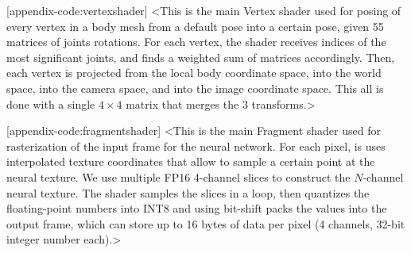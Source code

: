 [appendix-code:vertexshader]
<This is the main Vertex shader used for posing of every vertex in a body mesh from a default pose into a certain pose, given 55 matrices of joints rotations. For each vertex, the shader receives indices of the most significant joints, and finds a weighted sum of matrices accordingly. Then, each vertex is projected from the local body coordinate space, into the world space, into the camera space, and into the image coordinate space. This all is done with a single $4\times4$ matrix that merges the 3 transforms.>

[appendix-code:fragmentshader]
<This is the main Fragment shader used for rasterization of the input frame for the neural network. For each pixel, is uses interpolated texture coordinates that allow to sample a certain point at the neural texture. We use multiple FP16 4-channel slices to construct the $N$-channel neural texture. The shader samples the slices in a loop, then quantizes the floating-point numbers into INT8 and using bit-shift packs the values into the output frame, which can store up to 16 bytes of data per pixel (4 channels, 32-bit integer number each).>


\clearpage
\newpage
